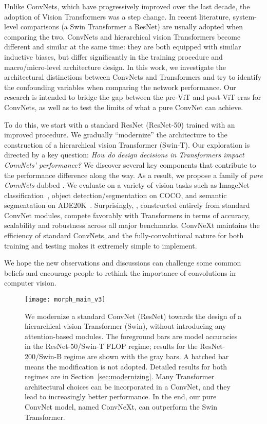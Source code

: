 Unlike ConvNets, which have progressively improved over the last decade, the adoption of Vision Transformers was a step change. In recent literature, system-level comparisons (\eg a Swin Transformer \vs a ResNet) are usually adopted when comparing the two. ConvNets and hierarchical vision Transformers become different and similar at the same time: they are both equipped with similar inductive biases, but differ significantly in the training procedure and macro/micro-level architecture design. 
In this work, 
we investigate the architectural distinctions between ConvNets and Transformers and try to identify the confounding variables when comparing the network performance.
Our research is intended to bridge the gap between the pre-ViT and post-ViT eras for ConvNets, as well as to test the limits of what a pure ConvNet can achieve. 

To do this, we start with a standard ResNet (\eg ResNet-50) trained with an improved procedure. We gradually ``modernize'' the architecture to the construction of a hierarchical vision Transformer (\eg Swin-T). Our exploration is directed by a key question: \emph{How do design decisions in Transformers impact ConvNets' performance?} We discover several key components that contribute to the performance difference along the way. As a result, we propose a family of \textit{pure ConvNets} dubbed \cnn{}. 
We evaluate  on a variety of vision tasks such as ImageNet classification~\cite{imagenet}, object detection/segmentation on COCO\cite{Lin2014}, and semantic segmentation on ADE20K~\cite{Zhou2019}. Surprisingly, , constructed entirely from standard ConvNet modules, compete favorably with Transformers in terms of accuracy, scalability and robustness across all major benchmarks. 
ConvNeXt maintains the efficiency of standard ConvNets, and the fully-convolutional nature for both training and testing makes it extremely simple to implement.

We hope the new observations and discussions can challenge some common beliefs and encourage people to rethink the importance of convolutions in computer vision.

\begin{figure}[!htbp] 
\centering
\texttt{[image: morph\_main\_v3]}
\caption{We modernize a standard ConvNet (ResNet) towards the design of a hierarchical vision Transformer (Swin), without introducing any attention-based modules. The foreground bars are model accuracies in the ResNet-50/Swin-T FLOP regime; results for the ResNet-200/Swin-B regime are shown with the gray bars. A hatched bar means the modification is not adopted. Detailed results for both regimes are in Section~\ref{sec:modernizing}. Many Transformer architectural choices can be incorporated in a ConvNet, and they lead to increasingly better performance. In the end, our pure ConvNet model, named ConvNeXt, can outperform the Swin Transformer.}
\label{fig:morph_main}
\end{figure}

